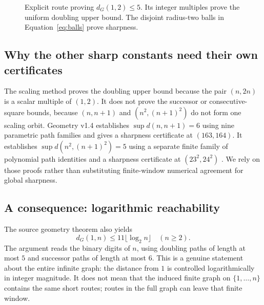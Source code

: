 \documentclass[11pt,a4paper]{article}
\theoremstyle{definition}\newtheorem{definition}[theorem]{Definition}
\begin{document}
\begin{figure}[htbp]
\centering
{}
\caption{Explicit route proving $d_G(1,2)\le5$. Its integer multiples prove the uniform doubling upper bound. The disjoint radius-two balls in Equation~\eqref{eq:balls} prove sharpness.}
\label{fig:doubling}
\end{figure}

\subsection{Why the other sharp constants need their own certificates}
The scaling method proves the doubling upper bound because the pair $(n,2n)$ is a scalar multiple of $(1,2)$. It does not prove the successor or consecutive-square bounds, because $(n,n+1)$ and $(n^2,(n+1)^2)$ do not form one scaling orbit. Geometry v1.4 establishes $\sup d(n,n+1)=6$ using nine parametric path families and gives a sharpness certificate at $(163,164)$. It establishes $\sup d(n^2,(n+1)^2)=5$ using a separate finite family of polynomial path identities and a sharpness certificate at $(23^2,24^2)$ \cite{geometry}. We rely on those proofs rather than substituting finite-window numerical agreement for global sharpness.

\subsection{A consequence: logarithmic reachability}
The source geometry theorem also yields
\begin{equation}\label{eq:logdistance}
d_G(1,n)\le 11\lfloor\log_2n\rfloor\quad(n\ge2).
\end{equation}
The argument reads the binary digits of $n$, using doubling paths of length at most $5$ and successor paths of length at most $6$. This is a genuine statement about the entire infinite graph: the distance from $1$ is controlled logarithmically in integer magnitude. It does not mean that the induced finite graph on $\{1,\ldots,n\}$ contains the same short routes; routes in the full graph can leave that finite window.
\end{document}

